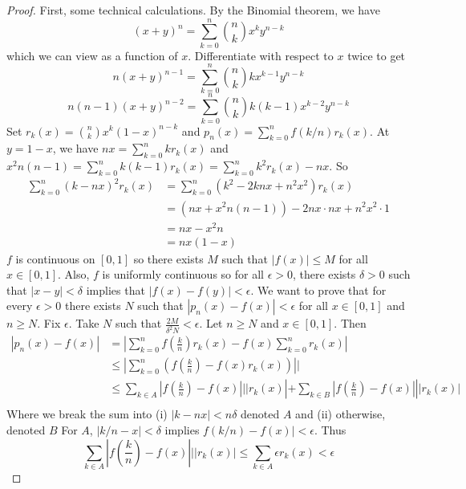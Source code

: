\documentclass[11pt, a4paper]{memoir}
\theoremstyle{change}
\theoremstyle{plain}
\theoremstyle{nonumberplain}
\newtheorem{proof}{Proof}
\numberwithin{equation}{section}
\begin{document}
\begin{proof}
    First, some technical calculations.
    By the Binomial theorem, we have
    \[(x+y)^n=\sum\limits_{k=0}^n\binom{n}{k}x^ky^{n-k}\]
    which we can view as a function of $x$.
    Differentiate with respect to $x$ twice to get
    \[n(x+y)^{n-1}=\sum\limits_{k=0}^n\binom{n}{k}kx^{k-1}y^{n-k}\]
    \[n(n-1)(x+y)^{n-2}=\sum\limits_{k=0}^n\binom{n}{k}k(k-1)x^{k-2}y^{n-k}\]
    Set $r_k(x)=\binom{n}{k}x^k(1-x)^{n-k}$ and $p_n(x)=\sum\limits_{k=0}^nf(k/n)r_k(x)$.
    At $y=1-x$, we have $nx=\sum\limits_{k=0}^nkr_k(x)$ and $x^2n(n-1)=\sum\limits_{k=0}^nk(k-1)r_k(x)=\sum\limits_{k=0}^nk^2r_k(x)-nx$.
    So
    \begin{align*}
        \sum\limits_{k=0}^n (k-nx)^2r_k(x) &= \sum\limits_{k=0}^n (k^2-2knx+n^2x^2)r_k(x)\\
                                           &= (nx+x^2n(n-1))-2nx\cdot nx+n^2x^2\cdot 1\\
                                           &= nx-x^2n\\
                                           &= nx(1-x)
    \end{align*}
    $f$ is continuous on $[0,1]$ so there exists $M$ such that $|f(x)|\leq M$ for all $x\in[0,1]$.
    Also, $f$ is uniformly continuous so for all $\epsilon>0$, there exists $\delta>0$ such that $|x-y|<\delta$ implies that $|f(x)-f(y)|<\epsilon$.
    We want to prove that for every $\epsilon>0$ there exists $N$ such that $|p_n(x)-f(x)|<\epsilon$ for all $x\in[0,1]$ and $n\geq N$.
    Fix $\epsilon$.
    Take $N$ such that $\frac{2M}{\delta^2N}<\epsilon$.
    Let $n\geq N$ and $x\in[0,1]$.
    Then
    \begin{align*}
        |p_n(x)-f(x)|&=\left\lvert\sum\limits_{k=0}^n f\left(\frac{k}{n}\right)r_k(x)-f(x)\sum\limits_{k=0}^nr_k(x)\right\rvert\\
                     &\leq\left\lvert\sum\limits_{k=0}^n \left(f\left(\frac{k}{n}\right)-f(x)r_k(x)\right)\right\rvert|\\
                     &\leq \sum_{k\in A}\left\lvert f\left(\frac{k}{n}\right)-f(x)\right\rvert||r_k(x)|+\sum_{k\in B}\left\lvert f\left(\frac{k}{n}\right)-f(x)\right\rvert||r_k(x)|\\
    \end{align*}
    Where we break the sum into (i) $|k-nx|<n\delta$ denoted $A$ and (ii) otherwise, denoted $B$
    For $A$, $|k/n-x|<\delta$ implies $f(k/n)-f(x)|<\epsilon$.
    Thus
    \[\sum\limits_{k\in A}\left\lvert f\left(\frac{k}{n}\right)-f(x)\right\rvert||r_k(x)|\leq\sum\limits_{k\in A}\epsilon r_k(x)<\epsilon\]


\end{proof}
\end{document}
